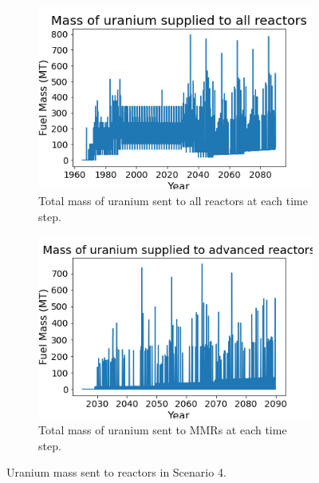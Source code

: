 \begin{figure}
    \centering
    \begin{subfigure}{0.4\textwidth}
        \centering
        \includegraphics[scale=0.3]{figures/fuelsupply_scenarios_4.png}
        \caption{Total mass of uranium sent to all reactors at each time step.}
        \label{fig:totalfuel_4}
    \end{subfigure}
    \begin{subfigure}{0.4\textwidth}
        \centering
        \includegraphics[scale=0.3]{figures/advancedRX_fuelsupply_scenarios_4.png}
        \caption{Total mass of uranium sent to \glspl{MMR} at each time step.}
        \label{fig:haleu_4}
    \end{subfigure}
    \caption{Uranium mass sent to reactors in Scenario 4.}
    \label{fig:fuel_4}
\end{figure}


